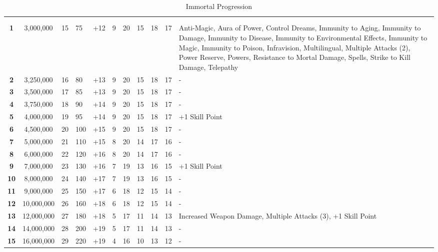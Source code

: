 \begin {table}[H]
  \caption{Immortal Progression}\label{tab:Immortal Progression}
	\begin{tabularx}{\columnwidth}{>{\bfseries}ccM{.15in}M{.25in}M{.35in}M{.38in}M{.35in}M{.38in}M{.35in}M{.35in}Y}
		\thead{} & \thead{} & \thead{} & \thead{} & \thead{} & \thead{} &  & \thead{}\\
		 &  &  &  &  &  &  &  &  &  & \\
	1 & 3,000,000 & 15 & 75 & +12 & 9 & 20 & 15 & 18 & 17 & Anti-Magic, Aura of Power, Control Dreams, Immunity to Aging, Immunity to Damage, Immunity to Disease, Immunity to Environmental Effects, Immunity to Magic, Immunity to Poison, Infravision, Multilingual, Multiple Attacks (2), 
Power Reserve, Powers, Resistance to Mortal Damage, 
Spells, Strike to Kill Damage, Telepathy\\
	2 & 3,250,000 & 16 & 80 & +13 & 9 & 20 & 15 & 18 & 17 & -\\
	3 & 3,500,000 & 17 & 85 & +13 & 9 & 20 & 15 & 18 & 17 & -\\
	4 & 3,750,000 & 18 & 90 & +14 & 9 & 20 & 15 & 18 & 17 & -\\
	5 & 4,000,000 & 19 & 95 & +14 & 9 & 20 & 15 & 18 & 17 & +1 Skill Point\\
	6 & 4,500,000 & 20 & 100 & +15 & 9 & 20 & 15 & 18 & 17 & -\\
	7 & 5,000,000 & 21 & 110 & +15 & 8 & 20 & 14 & 17 & 16 & -\\
	8 & 6,000,000 & 22 & 120 & +16 & 8 & 20 & 14 & 17 & 16 & -\\
	9 & 7,000,000 & 23 & 130 & +16 & 7 & 19 & 13 & 16 & 15 & +1 Skill Point\\
	10 & 8,000,000 & 24 & 140 & +17 & 7 & 19 & 13 & 16 & 15 & -\\
	11 & 9,000,000 & 25 & 150 & +17 & 6 & 18 & 12 & 15 & 14 & -\\
	12 & 10,000,000 & 26 & 160 & +18 & 6 & 18 & 12 & 15 & 14 & -\\
	13 & 12,000,000 & 27 & 180 & +18 & 5 & 17 & 11 & 14 & 13 & Increased Weapon Damage, Multiple Attacks (3), +1 Skill Point\\
	14 & 14,000,000 & 28 & 200 & +19 & 5 & 17 & 11 & 14 & 13 & -\\
	15 & 16,000,000 & 29 & 220 & +19 & 4 & 16 & 10 & 13 & 12 & -\\

\end{tabularx}
\end{table}
